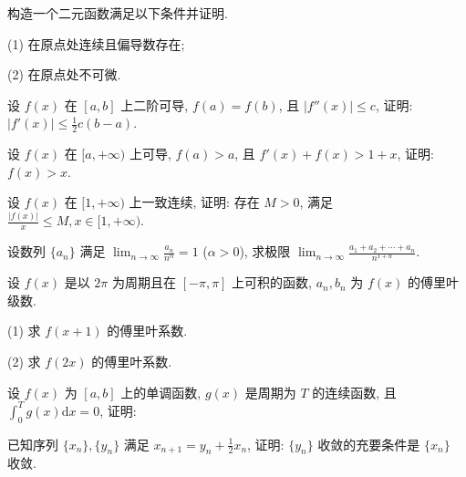 构造一个二元函数满足以下条件并证明.\par
(1) 在原点处连续且偏导数存在;\par
(2) 在原点处不可微.\par
设 $f(x)$ 在 $[a, b]$ 上二阶可导, $f(a) = f(b)$, 且 $|f''(x)| \leq c$, 证明: $|f'(x)| \leq \frac{1}{2} c (b - a)$.\par
设 $f(x)$ 在 $[a, +\infty)$ 上可导, $f(a) > a$, 且 $f'(x) + f(x) > 1 + x$, 证明: $f(x) > x$.\par
设 $f(x)$ 在 $[1, +\infty)$ 上一致连续, 证明: 存在 $M > 0$, 满足 $\frac{|f(x)|}{x} \leq M, x \in [1, +\infty)$.\par
设数列 $\{a_{n}\}$ 满足 $\lim_{n\to \infty}\frac{a_n}{n^\alpha} = 1$ ($\alpha >0$), 求极限 $\lim_{n\to \infty}\frac{a_1 + a_2 + \cdots + a_n}{n^{1 + \alpha}}$.\par
设 $f(x)$ 是以 $2\pi$ 为周期且在 $[- \pi, \pi]$ 上可积的函数, $a_n, b_n$ 为 $f(x)$ 的傅里叶级数.\par
(1) 求 $f(x + 1)$ 的傅里叶系数.\par
(2) 求  $f(2x)$  的傅里叶系数.\par
\par{}
设 $f(x)$ 为 $[a, b]$ 上的单调函数, $g(x)$ 是周期为 $T$ 的连续函数, 且 $\int_0^T g(x) \mathrm{d}x = 0$, 证明:\par
\nopagebreak[4]
已知序列 $\{x_{n}\}, \{y_{n}\}$ 满足 $x_{n+1} = y_{n} + \frac{1}{2} x_{n}$, 证明: $\{y_{n}\}$ 收敛的充要条件是 $\{x_{n}\}$ 收敛.\par
